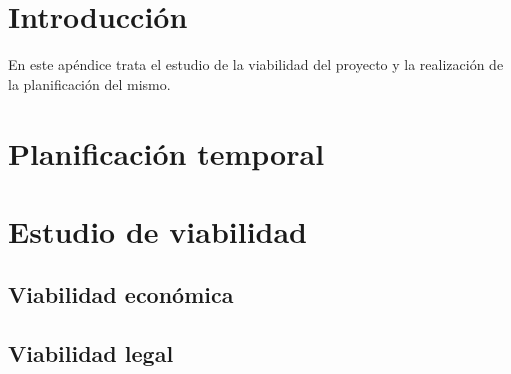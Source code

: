 
\section{Introducción}
En este apéndice trata el estudio de la viabilidad del proyecto y la realización de la planificación
del mismo.
\section{Planificación temporal}

\section{Estudio de viabilidad}

\subsection{Viabilidad económica}

\subsection{Viabilidad legal}


